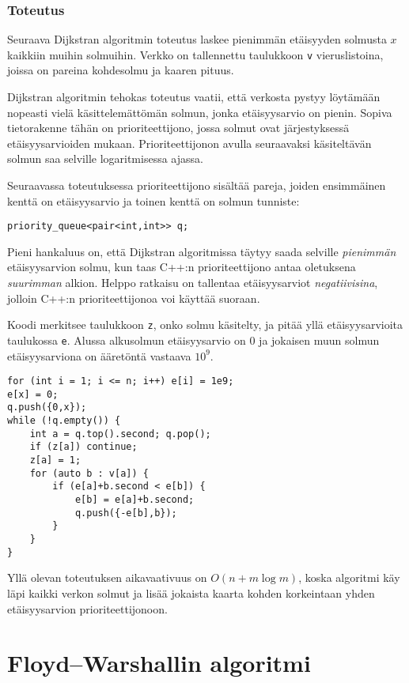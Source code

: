 \subsubsection{Toteutus}

Seuraava Dijkstran algoritmin toteutus laskee
pienimmän etäisyyden solmusta $x$ kaikkiin muihin solmuihin.
Verkko on tallennettu taulukkoon \texttt{v}
vieruslistoina, joissa on pareina kohdesolmu
ja kaaren pituus.

Dijkstran algoritmin tehokas toteutus vaatii,
että verkosta pystyy löytämään
nopeasti vielä käsittelemättömän solmun,
jonka etäisyysarvio on pienin.
Sopiva tietorakenne tähän on prioriteettijono,
jossa solmut ovat järjestyksessä etäisyys\-arvioiden mukaan.
Prioriteettijonon avulla
seuraavaksi käsiteltävän solmun saa selville logaritmisessa ajassa.

Seuraavassa toteutuksessa prioriteettijono sisältää
pareja, joiden ensimmäinen kenttä on etäisyysarvio
ja toinen kenttä on solmun tunniste:
\begin{lstlisting}
priority_queue<pair<int,int>> q;
\end{lstlisting}
Pieni hankaluus on,
että Dijkstran algoritmissa täytyy saada selville
\emph{pienimmän} etäisyysarvion solmu,
kun taas C++:n prioriteettijono antaa oletuksena
\emph{suurimman} alkion.
Helppo ratkaisu on tallentaa etäisyysarviot
\emph{negatiivisina}, jolloin C++:n prioriteettijonoa
voi käyttää suoraan.

Koodi merkitsee taulukkoon \texttt{z},
onko solmu käsitelty,
ja pitää yllä etäisyysarvioita taulukossa \texttt{e}.
Alussa alkusolmun etäisyysarvio on 0
ja jokaisen muun solmun etäisyysarviona
on ääretöntä vastaava $10^9$.

\begin{lstlisting}
for (int i = 1; i <= n; i++) e[i] = 1e9;
e[x] = 0;
q.push({0,x});
while (!q.empty()) {
    int a = q.top().second; q.pop();
    if (z[a]) continue;
    z[a] = 1;
    for (auto b : v[a]) {
        if (e[a]+b.second < e[b]) {
            e[b] = e[a]+b.second;
            q.push({-e[b],b});
        }
    }
}
\end{lstlisting}

Yllä olevan toteutuksen aikavaativuus on $O(n+m \log m)$,
koska algoritmi käy läpi kaikki verkon solmut
ja lisää jokaista kaarta kohden korkeintaan
yhden etäisyysarvion prioriteettijonoon.

\section{Floyd–Warshallin algoritmi}

